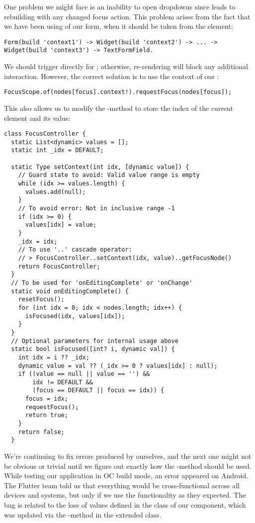 \noindent One problem we might face is an inability to open dropdowns since  
leads to rebuilding with any changed focus action. This problem arises from the fact that we have been using 
 of our form, when it should be taken from the  element:

\begin{lstlisting}
Form(build 'context1') -> Widget(build 'context2') -> ... -> Widget(build 'context3') -> TextFormField.
\end{lstlisting}

\noindent We should trigger  directly for ; otherwise, re-rendering 
will block any additional interaction. However, the correct solution is to use the context of our :

\begin{lstlisting}
FocusScope.of(nodes[focus].context!).requestFocus(nodes[focus]);
\end{lstlisting}

\noindent This also allows us to modify the -method to store the index of the current element and its 
value:

\begin{lstlisting}
class FocusController {
  static List<dynamic> values = [];
  static int _idx = DEFAULT;

  static Type setContext(int idx, [dynamic value]) {
    // Guard state to avoid: Valid value range is empty
    while (idx >= values.length) {
      values.add(null);
    }
    // To avoid error: Not in inclusive range -1
    if (idx >= 0) {
      values[idx] = value;
    }
    _idx = idx;
    // To use '..' cascade operator:
    // > FocusController..setContext(idx, value)..getFocusNode()
    return FocusController; 
  }
  // To be used for 'onEditingComplete' or 'onChange'
  static void onEditingComplete() {
    resetFocus();
    for (int idx = 0; idx < nodes.length; idx++) {
      isFocused(idx, values[idx]);
    }
  }
  // Optional parameters for internal usage above
  static bool isFocused([int? i, dynamic val]) {
    int idx = i ?? _idx;
    dynamic value = val ?? (_idx >= 0 ? values[idx] : null);
    if ((value == null || value == '') &&
        idx != DEFAULT &&
        (focus == DEFAULT || focus == idx)) {
      focus = idx;
      requestFocus();
      return true;
    }
    return false;
  }
\end{lstlisting}

\noindent We're continuing to fix errors produced by ourselves, and the next one might not be obvious or trivial until 
we figure out exactly how the -method should be used. While testing our application in OC build mode, an 
error appeared on Android. The Flutter team told us that everything would be cross-functional across all devices and 
systems, but only if we use the functionality as they expected. The bug is related to the loss of values defined in the 
 class of our component, which was updated via the -method in the  extended class.

